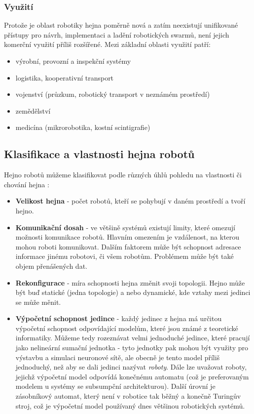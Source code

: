 \documentclass[a4paper,12pt]{article}
\begin{document}
\subsubsection{Využití}
Protože je oblast robotiky hejna poměrně nová a zatím neexistují unifikované přístupy
pro návrh, implementaci a ladění robotických swarmů, není jejich komerční využití
příliš rozšířené. Mezi základní oblasti využití patří:
\begin{itemize}
  \item výrobní, provozní a inspekční systémy
  \item logistika, kooperativní transport
  \item vojenství (průzkum, robotický transport v neznámém prostředí)
  \item zemědělství
  \item medicína (mikrorobotika, kostní scintigrafie\cite{Rifaie11})
\end{itemize}


\subsection{Klasifikace a vlastnosti hejna robotů}
Hejno robotů můžeme klasifikovat podle různých úhlů pohledu na vlastnosti
či chování hejna \cite{Dudek93}:
\begin{itemize}
  \item {\bf Velikost hejna} {- počet robotů, kteří se pohybují v daném prostředí a tvoří hejno.}
  \item {\bf Komunikační dosah} {- ve většině systémů existují limity, které omezují
     možnosti komunikace robotů. Hlavním omezením je vzdálenost, na kterou mohou
     roboti komunikovat. Dalším faktorem může být schopnost adresace informace
     jinému robotovi, či všem robotům. Problémem může být také objem přenášených dat.}
  \item {\bf Rekonfigurace} {- míra schopnosti hejna změnit svoji topologii. Hejno může být buď
     statické (jedna topologie) a nebo dynamické, kde vztahy mezi jedinci se může měnit.}
  \item {\bf Výpočetní schopnost jedince} {- každý jedinec z hejna má určitou výpočetní schopnost
     odpovídající modelům, které jsou známé z teoretické informatiky. Můžeme tedy rozeznávat
     velmi jednoduché jedince, které pracují jako nelineární sumační jednotka - tyto jednotky
     pak mohou být využity pro výstavbu a simulaci neuronové sítě, ale obecně je tento model
     příliš jednoduchý, než aby se dali jedinci nazývat {\it roboty}. Dále lze uvažovat
     roboty, jejichž výpočetní model odpovídá konečnému automatu (což je preferovaným modelem
     u systémy se subsumpční architekturou). Další úrovní je zásobníkový automat, který není
     v robotice tak běžný a konečně Turingův stroj, což je výpočetní model používaný dnes
     většinou robotických systémů.}
\end{itemize}
\end{document}
